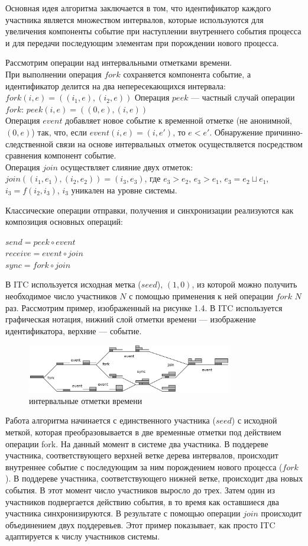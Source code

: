 Основная идея алгоритма заключается в том, что идентификатор каждого участника является множеством интервалов, которые используются для увеличения компоненты событие при наступлении внутреннего события процесса и для передачи последующим элементам при порождении нового процесса.

Рассмотрим операции над интервальными отметками времени.\\
При выполнении операция $fork$ сохраняется компонента событие, а идентификатор делится на два непересекающихся интервала: $fork(i,e) = ((i_1,e),(i_2,e))$  
Операция $peek$ --- частный случай операции $fork$: $peek(i,e)=((0,e),(i,e))$\\
Операция $event$ добавляет новое событие к временной отметке (не анонимной, $(0,e)$) так, что, если $event(i,e) = (i,e')$, то $e < e'$. 
Обнаружение причинно-следственной связи на основе интервальных отметок осуществляется посредством сравнения компонент событие.\\
Операция $join$ осуществляет слияние двух отметок: $join((i_1,e_1),(i_2,e_2)) = (i_3,e_3)$, где
$e_3 > e_2$, $e_3 > e_1$, $e_3 = e_2 \sqcup e_1$, $i_3 = f(i_2,i_3)$, $i_3$ уникален на уровне системы.

Классические операции отправки, получения и синхронизации реализуются как композиция основных операций:
\begin{center}
$send = peek \circ event$\\
$receive = event \circ join$\\
$sync = fork \circ join$
\end{center}
В ITC используется исходная метка ($seed$), $(1,0)$, из которой можно получить необходимое число участников $N$ с помощью применения к ней операции $fork$ $N$ раз.
Рассмотрим пример, изображенный на рисунке 1.4. В ITC используется графическая нотация, нижний слой отметки времени --- изображение идентификатора, верхние --- событие. 
\begin{figure}
\centering
\includegraphics[width=0.8\textwidth]{img/tree.png}
\caption{интервальные отметки времени}
\end{figure}
Работа алгоритма начинается с единственного участника ($seed$) с исходной меткой, которая преобразовывается в две временные отметки под действием операции fork. На данный момент в системе два участника. В поддереве участника, соответствующего верхней ветке дерева интервалов, происходит внутреннее событие с последующим за ним порождением нового процесса ($fork$). В поддереве участника, соответствующего нижней ветке, происходит два новых события. В этот момент число участников выросло до трех. Затем один из участников подвергается действию события, в то время как оставшиеся два участника синхронизируются. В результате с помощью операции $join$ происходит объединением двух поддеревьев. Этот пример показывает, как просто ITC адаптируется к числу участников системы.

